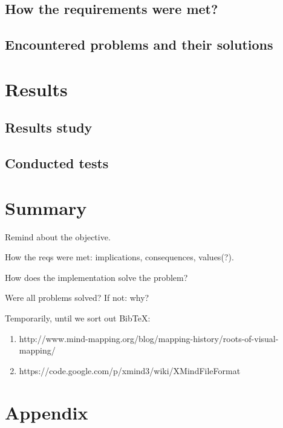 \documentclass[american]{bsc}
\begin{document}
\section{How the requirements were met?}
\label{implrequirements}

\section{Encountered problems and their solutions}
\label{implproblems}

\chapter{Results}
\label{chap:results}

\section{Results study}
\label{sec:resstudy}

\section{Conducted tests}
\label{sec:tests}

\chapter{Summary}
\label{chap:summary}

Remind about the objective.

How the reqs were met: implications, consequences, values(?).

How does the implementation solve the problem?

Were all problems solved? If not: why?




Temporarily, until we sort out BibTeX:

\begin{enumerate}
	\item http://www.mind-mapping.org/blog/mapping-history/roots-of-visual-mapping/
	\item https://code.google.com/p/xmind3/wiki/XMindFileFormat
\end{enumerate}

\appendix

\chapter{Appendix}
\label{chap:appendix}
\end{document}
